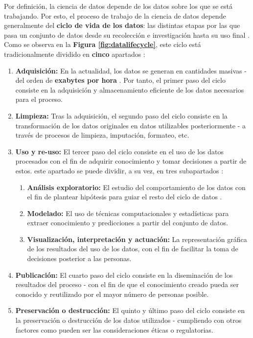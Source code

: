 Por definición, la ciencia de datos depende de los datos sobre los que se está trabajando. Por esto, el proceso de trabajo de la ciencia de datos depende generalmente del \textbf{ciclo de vida de los datos}: las distintas etapas por las que pasa un conjunto de datos desde su recolección e investigación hasta su uso final \cite{datasciencelifecycle}. Como se observa en la \textbf{Figura \ref{fig:datalifecycle}}, este ciclo está tradicionalmente dividido en \textbf{cinco} apartados \cite{potential}:

\begin{enumerate}[parsep=1pt, itemsep=1pt, topsep=4pt]
	\item \textbf{Adquisición:} En la actualidad, los datos se generan en cantidades masivas - del orden de \textbf{exabytes por hora} \cite{Wing2019Data}. Por tanto, el primer paso del ciclo consiste en la adquisición y almacenamiento eficiente de los datos necesarios para el proceso.
	\item \textbf{Limpieza:} Tras la adquisición, el segundo paso del ciclo consiste en la transformación de los datos originales en datos utilizables posteriormente - a través de procesos de limpieza, imputación, formateo, etc.
	\item \textbf{Uso y re-uso:}  El tercer paso del ciclo consiste en el uso de los datos procesados con el fin de adquirir conocimiento y tomar decisiones a partir de estos. este apartado se puede dividir, a su vez, en tres subapartados \cite{Wing2019Data}:
		\begin{enumerate}[parsep=1pt, itemsep=1pt, topsep=4pt]
			\item \textbf{Análisis exploratorio:} El estudio del comportamiento de los datos con el fin de plantear hipótesis para guiar el resto del ciclo de datos \cite{eda}.
			\item \textbf{Modelado:} El uso de técnicas computacionales y estadísticas para extraer conocimiento y predicciones a partir del conjunto de datos.
			\item \textbf{Visualización, interpretación y actuación:}  La representación gráfica de los resultados del uso de los datos, con el fin de facilitar la toma de decisiones posterior a las personas.
		\end{enumerate}
	\item \textbf{Publicación:} El cuarto paso del ciclo consiste en la diseminación de los resultados del proceso - con el fin de que el conocimiento creado pueda ser conocido y reutilizado por el mayor número de personas posible.
	\item \textbf{Preservación o destrucción:} El quinto y último paso del ciclo consiste en la preservación o destrucción de los datos utilizados - cumpliendo con otros factores como pueden ser las consideraciones éticas o regulatorias.
\end{enumerate}

